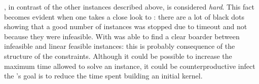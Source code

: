 
\Instance{}, in contrast of the other instances described above, is considered \emph{hard}. This fact becomes evident when one
takes a close look to \Figure{}: there are a lot of black dots showing that a good number of instances was stopped due to  timeout and
not because they were infeasible. With \Instance{} \fk{} was able to find a clear boarder between infeasible and linear feasible 
instances: this is probably consequence of the structure of the constraints. Although it could be possible to increase the 
maximum time allowed to solve an instance, it could be counterproductive infect the \fk's goal is to reduce the time spent 
building an initial kernel. 








